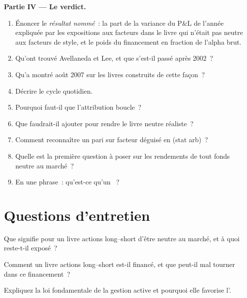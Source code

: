 \begin{problem}
\medskip\noindent\textbf{Partie IV --- Le verdict.}
\begin{enumerate}[resume]
\item Énoncer le \emph{résultat nommé}~: la part de la variance du P\&L de l'année expliquée par les expositions aux facteurs dans le livre qui n'était pas neutre aux facteurs de style, et le
poids du financement en fraction de l'alpha brut.
\item Qu'ont trouvé Avellaneda et Lee, et que s'est-il passé après 2002~?
\item Qu'a montré août 2007 sur les livres construits de cette façon~?
\item Décrire le cycle quotidien.
\item Pourquoi faut-il que l'attribution boucle~?
\item Que faudrait-il ajouter pour rendre le livre neutre réaliste~?
\item Comment reconnaître un pari sur facteur déguisé en  (stat arb)~?
\item Quelle est la première question à poser sur les rendements de tout fonds neutre au marché~?
\item En une phrase~: qu'est-ce qu'un ~?
\end{enumerate}
\end{problem}

\section{Questions d'entretien}

\begin{interviewq}\label{iq:s1:anatomy-of-a-stat-arb-book:1}
Que signifie pour un livre actions long--short d'être neutre au marché, et à quoi reste-t-il exposé~?
\end{interviewq}

\begin{interviewq}\label{iq:s1:anatomy-of-a-stat-arb-book:2}
Comment un livre actions long--short est-il financé, et que peut-il mal tourner dans ce financement~?
\end{interviewq}

\begin{interviewq}\label{iq:s1:anatomy-of-a-stat-arb-book:3}
Expliquez la loi fondamentale de la gestion active et pourquoi elle favorise l'.
\end{interviewq}

